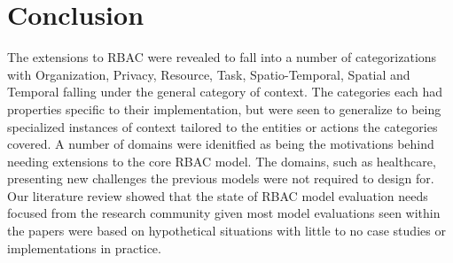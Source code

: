 \section{Conclusion} \label{sec:conclusion}

The extensions to RBAC were revealed to fall into a number of categorizations with Organization, Privacy, Resource, Task, Spatio-Temporal, Spatial and Temporal falling under the general category of context.
The categories each had properties specific to their implementation, but were seen to generalize to being specialized instances of context tailored to the entities or actions the categories covered.
A number of domains were idenitfied as being the motivations behind needing extensions to the core RBAC model.  The domains, such as healthcare, presenting new challenges the previous models were not
required to design for.  Our literature review showed that the state of RBAC model evaluation needs focused from the research community given most model evaluations seen within the papers were
based on hypothetical situations with little to no case studies or implementations in practice.
